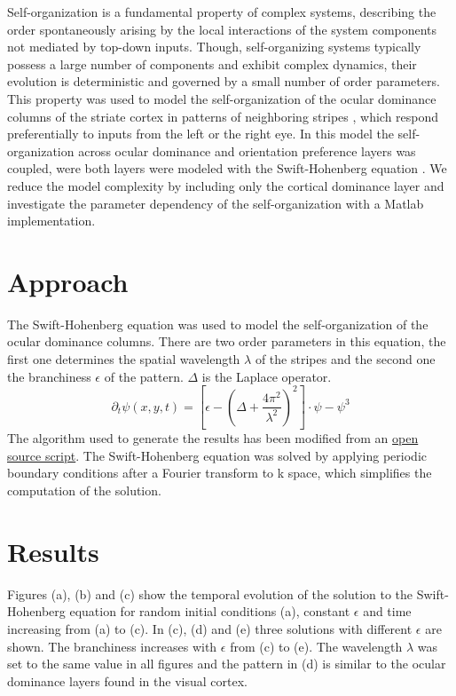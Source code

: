 \documentclass[twocolumn]{bmcart}%
\begin{document}
Self-organization is a fundamental property of complex systems,
describing the order spontaneously arising by the local interactions of
the system components not mediated by top-down inputs. Though,
self-organizing systems typically possess a large number of components
and exhibit complex dynamics, their evolution is deterministic and
governed by a small number of order parameters. This property was used
to model the self-organization of the ocular dominance columns of
the striate cortex in patterns of neighboring stripes \cite{Reichl2012}, 
which respond preferentially to inputs from the left or the right eye. 
In this model the self-organization across ocular dominance and 
orientation preference layers was coupled, were both layers were modeled 
with the Swift-Hohenberg equation \cite{Hohenberg1992}. We reduce the model 
complexity by including only the cortical dominance layer and investigate the 
parameter dependency of the self-organization with a Matlab implementation. 

\section{Approach}\label{approach}

The Swift-Hohenberg equation \cite{Hohenberg1992} was used to model the 
self-organization of the ocular dominance columns. There are two order 
parameters in this equation, the first one determines the spatial wavelength 
\(\lambda\) of the stripes and the second one the branchiness \(\epsilon\) 
of the pattern. $\Delta$ is the Laplace operator.
\begin{equation}
\partial_{t}\psi{(x,y,t)}= [\epsilon-(\Delta+\frac{4\pi^2}{\lambda^2})^2]\cdot\psi - \psi^3
\end{equation}
The algorithm used to generate the results has been modified
from an \href{http://nile.physics.ncsu.edu/hon292a-f08/}{open source script}. 
The Swift-Hohenberg equation was solved by 
applying periodic boundary conditions after a Fourier transform to k space, 
which simplifies the computation of the solution.

\section{Results}\label{results}

Figures (a), (b) and (c) show the temporal evolution of the solution to
the Swift-Hohenberg equation for random initial conditions (a), constant
\(\epsilon\) and time increasing from (a) to (c). In (c), (d) and (e)
three solutions with different \(\epsilon\) are shown. The branchiness
increases with \(\epsilon\) from (c) to (e). The wavelength \(\lambda\)
was set to the same value in all figures and the pattern in (d) is
similar to the ocular dominance layers found in the visual cortex.
\end{document}
